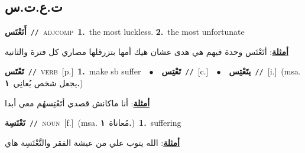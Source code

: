\documentclass[10pt,a4paper,twoside]{article} %
\begin{document}
\begin{multicols}{2}
\vspace{-3mm}
\subsection*{\color{blue}\foreignlanguage{arabic}{ت.ع.ت.س}\color{blue}{}} 

{\setlength\topsep{0pt}\textbf{\foreignlanguage{arabic}{أَتَعْتَس}}\ {\color{gray}\texttt{//}\color{black}}\ \textsc{adj\textunderscore comp}\ \textbf{1.}~the most luckless.  \textbf{2.}~the most unfortunate\  \begin{flushright}\color{gray}\foreignlanguage{arabic}{\textbf{\underline{\foreignlanguage{arabic}{أمثلة}}}: أتَعْتَس وحدة فيهم هي هدى عشان هيك أمها بتزرقلها مصاري كل فترة والثانية}\end{flushright}\color{black}} \vspace{2mm}

{\setlength\topsep{0pt}\textbf{\foreignlanguage{arabic}{تَعْتَس}}\ {\color{gray}\texttt{//}\color{black}}\ \textsc{verb}\ [p.]\ \textbf{1.}~make sb suffer\ \ $\bullet$\ \ \setlength\topsep{0pt}\textbf{\foreignlanguage{arabic}{تَعْتِس}}\ {\color{gray}\texttt{//}\color{black}}\ [c.]\ \ $\bullet$\ \ \setlength\topsep{0pt}\textbf{\foreignlanguage{arabic}{يتَعْتِس}}\ {\color{gray}\texttt{//}\color{black}}\ [i.]\ \color{gray}(msa. \foreignlanguage{arabic}{يجعل شخص يُعانِي}~\foreignlanguage{arabic}{\textbf{١.}})\color{black}\  \begin{flushright}\color{gray}\foreignlanguage{arabic}{\textbf{\underline{\foreignlanguage{arabic}{أمثلة}}}: أنا ماكانش قصدي أتَعْتِسهُم معي أبدا}\end{flushright}\color{black}} \vspace{2mm}

{\setlength\topsep{0pt}\textbf{\foreignlanguage{arabic}{تَعْتَسِة}}\ {\color{gray}\texttt{//}\color{black}}\ \textsc{noun}\ [f.]\ \color{gray}(msa. \foreignlanguage{arabic}{مُعاناة}~\foreignlanguage{arabic}{\textbf{١.}})\color{black}\ \textbf{1.}~suffering\  \begin{flushright}\color{gray}\foreignlanguage{arabic}{\textbf{\underline{\foreignlanguage{arabic}{أمثلة}}}: الله يتوب علي من عيشة الفقر والتَّعْتَسِة هاي}\end{flushright}\color{black}} \vspace{2mm}


\end{multicols}
\end{document}
